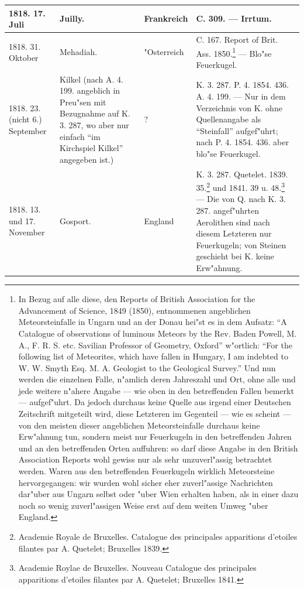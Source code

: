 \documentclass[a4paper, 8pt, oneside, polutonikogreek, german]{article}
\begin{document}
\begin{center}
\begin{longtable}{| p{20mm} | p{25mm} | p{20mm} | p{55mm} |}
        1818. 17. Juli & Juilly. & Frankreich & C. 309. --- Irrtum. \\ \hline
        1818. 31. Oktober & Mehadiah. & "Osterreich & C. 167. Report of Brit. Ass. 1850.\footnote{In Bezug auf alle diese, den Reports of British Association for the Advancement of Science, 1849 (1850), entnommenen angeblichen Meteorsteinfalle in Ungarn und an der Donau hei"st es in dem Aufsatz: "`A Catalogue of observations of luminous Meteors by the Rev. Baden Powell, M. A., F. R. S. etc. Savilian Professor of Geometry, Oxford"' w"ortlich: "`For the following list of Meteorites, which have fallen in Hungary, I am indebted to W. W. Smyth Esq. M. A. Geologist to the Geological Survey."' Und nun werden die einzelnen Falle, n"amlich deren Jahreszahl und Ort, ohne alle und jede weitere n"ahere Angabe --- wie oben in den betreffenden Fallen bemerkt --- aufgef"uhrt. Da jedoch durchaus keine Quelle aus irgend einer Deutschen Zeitschrift mitgeteilt wird, diese Letzteren im Gegenteil --- wie es scheint --- von den meisten dieser angeblichen Meteorsteinfalle durchaus keine Erw"ahnung tun, sondern meist nur Feuerkugeln in den betreffenden Jahren und an den betreffenden Orten auffuhren: so darf diese Angabe in den British Association Reports wohl gewiss nur als sehr unzuverl"assig betrachtet werden. Waren aus den betreffenden Feuerkugeln wirklich Meteorsteine hervorgegangen: wir wurden wohl sicher eher zuverl"assige Nachrichten dar"uber aus Ungarn selbst oder "uber Wien erhalten haben, als in einer dazu noch so wenig zuverl"assigen Weise erst auf dem weiten Umweg "uber England.} --- Blo"se Feuerkugel. \\ \hline
        1818. 23. (nicht 6.) September & Kilkel (nach A. 4. 199. angeblich in Preu"sen mit Bezugnahme auf K. 3. 287, wo aber nur einfach "`im Kirchspiel Kilkel"' angegeben ist.) & ? & K. 3. 287. P. 4. 1854. 436. A. 4. 199. --- Nur in dem Verzeichnis von K. ohne Quellenangabe als "`Steinfall"' aufgef"uhrt; nach P. 4. 1854. 436. aber blo"se Feuerkugel. \\ \hline
        1818. 13. und 17. November & Gosport. & England & K. 3. 287. Quetelet. 1839. 35.\footnote{Academie Royale de Bruxelles. Catalogue des principales apparitions d'etoiles filantes par A. Quetelet; Bruxelles 1839.} und 1841. 39 u. 48.\footnote{Academie Roylae de Bruxelles. Nouveau Catalogue des principales apparitions d'etoiles filantes par A. Quetelet; Bruxelles 1841.} --- Die von Q. nach K. 3. 287. angef"uhrten Aerolithen sind nach diesem Letzteren nur Feuerkugeln; von Steinen geschieht bei K. keine Erw"ahnung. \\ \hline

\end{longtable}
\end{center}
\end{document}
